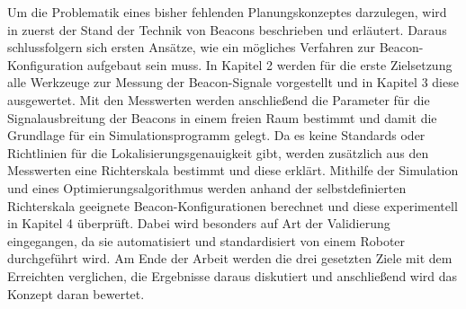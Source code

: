Um die Problematik eines bisher fehlenden Planungskonzeptes darzulegen, wird in zuerst der Stand der Technik von Beacons beschrieben und erläutert. Daraus schlussfolgern sich ersten Ansätze, wie ein mögliches Verfahren zur Beacon-Konfiguration aufgebaut sein muss. In Kapitel 2 werden für die erste Zielsetzung alle Werkzeuge zur Messung der Beacon-Signale vorgestellt und in Kapitel 3 diese ausgewertet. Mit den Messwerten werden anschließend die Parameter für die Signalausbreitung der Beacons in einem freien Raum bestimmt und damit die Grundlage für ein Simulationsprogramm gelegt. Da es keine Standards oder Richtlinien für die Lokalisierungsgenauigkeit gibt, werden zusätzlich aus den Messwerten eine Richterskala bestimmt und diese erklärt. Mithilfe der Simulation und eines Optimierungsalgorithmus werden anhand der selbstdefinierten Richterskala geeignete Beacon-Konfigurationen berechnet und diese experimentell in Kapitel 4 überprüft. Dabei wird besonders auf Art der Validierung eingegangen, da sie automatisiert und standardisiert von einem Roboter durchgeführt wird. Am Ende der Arbeit werden die drei gesetzten Ziele mit dem Erreichten verglichen, die Ergebnisse daraus diskutiert und anschließend wird das Konzept daran bewertet. 
 






%
%
%
%
%
%
%
%
